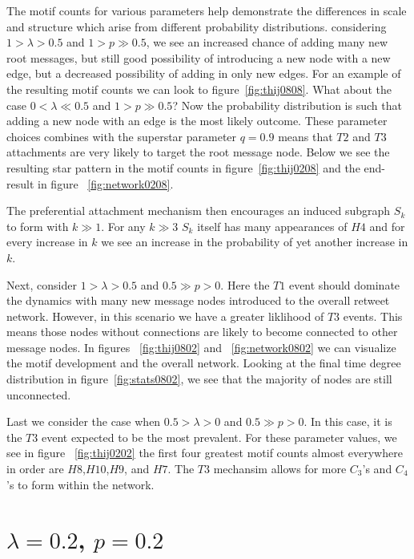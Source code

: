 The motif counts for various parameters help demonstrate the differences in scale 
and structure which arise from different probability distributions. 
considering $1>\lambda>0.5$ and $1>p\gg0.5$, we see an increased chance of adding
many new root messages, but still good possibility of introducing a new node with a new edge, but a decreased possibility of 
adding in only new edges. For an example of the resulting motif counts we can look to figure~\ref{fig:thij0808}. 
What about the case $0 < \lambda \ll 0.5$ and $1 > p \gg 0.5$? Now the probability distribution is such that adding a new node
with an edge is the most likely outcome. These parameter choices combines with the superstar parameter $q=0.9$ means that $T2$ and $T3$
attachments are very likely to target the root message node. Below we see the resulting star pattern in the motif counts in figure~\ref{fig:thij0208}
and the end-result in figure ~\ref{fig:network0208}.

The preferential attachment mechanism then encourages
 an induced subgraph $S_{k}$ to form with $k\gg 1$.
 For any $k \gg 3$ $S_{k}$
itself has many appearances of $H4$ and for every increase in $k$ we see an increase in the probability
of yet another increase in $k$.

Next, consider $1>\lambda>0.5$ and $0.5 \gg p > 0$. Here the $T1$ event should dominate the dynamics
 with many new message nodes introduced to the overall retweet network. However, in this scenario we have
 a greater liklihood of $T3$ events. This means those nodes without connections are likely to become connected to other message nodes. In figures
 ~\ref{fig:thij0802} and ~\ref{fig:network0802} we can visualize the motif development and the overall network. Looking at the final time degree
 distribution in figure~\ref{fig:stats0802}, we see that the majority of nodes are still unconnected.

Last we consider the case when $0.5 > \lambda > 0$ and $0.5 \gg p > 0$. In this case, it is the $T3$ event
 expected to be the most prevalent. For these parameter values, we see in figure ~\ref{fig:thij0202} the first four greatest motif counts almost 
 everywhere in order are $H8$,$H10$,$H9$, and $H7$. The $T3$ mechansim allows for more $C_3$'s and $C_4$'s to form within the network.



\section{$\lambda=0.2$, $p=0.2$}

